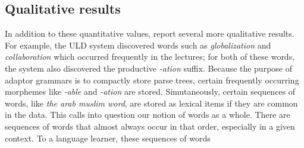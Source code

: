 \documentclass[12pt,letterpaper]{article}
\begin{document}
\subsection{Qualitative results}
In addition to these quantitative values, \citet{lee:2015} report several more qualitative results. For example, the ULD system discovered words such as \textit{globalization} and \textit{collaboration} which occurred frequently in the lectures; for both of these words, the system also discovered the productive \textit{-ation} suffix. Because the purpose of adaptor grammars is to compactly store parse trees, certain frequently occurring morphemes like \textit{-able} and \textit{-ation} are stored. Simutaneously, certain sequences of words, like \textit{the arab muslim word}, are stored as lexical items if they are common in the data. This calls into question our notion of words as a whole. There are sequences of words that almost always occur in that order, especially in a given context. To a language learner, these sequences of words 


\appendix




\newpage 



\end{document}
